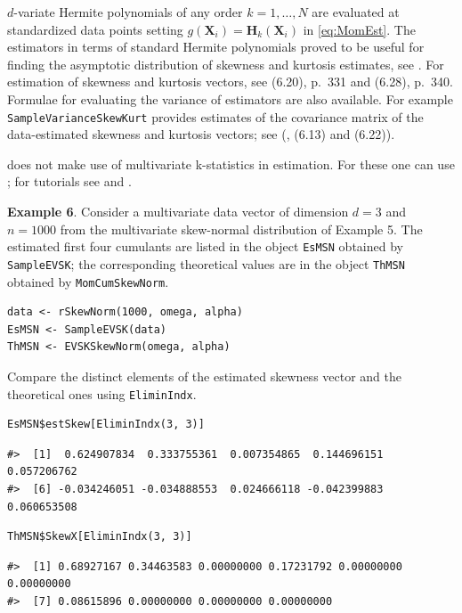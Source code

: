 \(d\)-variate Hermite polynomials of any order \(k=1, \dots, N\) are evaluated at standardized data points setting \(g(\mathbf{X}_i)=\mathbf{H}_k(\mathbf{X}_i)\) in \eqref{eq:MomEst}. The estimators in terms of standard Hermite polynomials proved to be useful for finding the asymptotic distribution of skewness and kurtosis estimates, see \citet{jamma2021SJS}. For estimation of skewness and kurtosis vectors, see \citet{terdik2021multivariate} (6.20), p.~331 and (6.28), p.~340. Formulae for evaluating the variance of estimators are also available. For example \texttt{SampleVarianceSkewKurt} provides estimates of the covariance matrix of the data-estimated skewness and kurtosis vectors; see (\citet{terdik2021multivariate}, (6.13) and (6.22)).

 does not make use of multivariate k-statistics in estimation. For these one can use ; for tutorials see \citet{dinardo22b} and \citet{smith2020tutorial}.

\textbf{Example 6}. Consider a multivariate data vector of dimension \(d=3\) and \(n=1000\) from the multivariate skew-normal distribution of Example 5. The estimated first four cumulants are listed in the object \texttt{EsMSN} obtained by \texttt{SampleEVSK}; the corresponding theoretical values are in the object \texttt{ThMSN} obtained by \texttt{MomCumSkewNorm}.

\begin{verbatim}
data <- rSkewNorm(1000, omega, alpha)
EsMSN <- SampleEVSK(data)
ThMSN <- EVSKSkewNorm(omega, alpha)
\end{verbatim}

Compare the distinct elements of the estimated skewness vector and the theoretical ones using \texttt{EliminIndx}.

\begin{verbatim}
EsMSN$estSkew[EliminIndx(3, 3)]
\end{verbatim}

\begin{verbatim}
#>  [1]  0.624907834  0.333755361  0.007354865  0.144696151  0.057206762
#>  [6] -0.034246051 -0.034888553  0.024666118 -0.042399883  0.060653508
\end{verbatim}

\begin{verbatim}
ThMSN$SkewX[EliminIndx(3, 3)]
\end{verbatim}

\begin{verbatim}
#>  [1] 0.68927167 0.34463583 0.00000000 0.17231792 0.00000000 0.00000000
#>  [7] 0.08615896 0.00000000 0.00000000 0.00000000
\end{verbatim}

